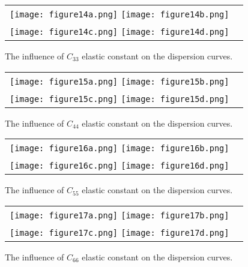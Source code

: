 \documentclass[]{spie}  %
\begin{document}
\begin{figure} [ht]
	\begin{center}
		\begin{tabular}{cc} %
			\texttt{[image: figure14a.png]}
			\texttt{[image: figure14b.png]}\\
			\texttt{[image: figure14c.png]}
			\texttt{[image: figure14d.png]}
		\end{tabular}
	\end{center}
	\caption[] 
	{ \label{fig:C33} 
		The influence of \(C_{33}\) elastic constant on the dispersion curves.}
\end{figure} 

\begin{figure} [ht]
	\begin{center}
		\begin{tabular}{cc} %
			\texttt{[image: figure15a.png]}
			\texttt{[image: figure15b.png]}\\
			\texttt{[image: figure15c.png]}
			\texttt{[image: figure15d.png]}
		\end{tabular}
	\end{center}
	\caption[] 
	{ \label{fig:C44} 
		The influence of \(C_{44}\) elastic constant on the dispersion curves.}
\end{figure} 

\begin{figure} [ht]
	\begin{center}
		\begin{tabular}{cc} %
			\texttt{[image: figure16a.png]}
			\texttt{[image: figure16b.png]}\\
			\texttt{[image: figure16c.png]}
			\texttt{[image: figure16d.png]}
		\end{tabular}
	\end{center}
	\caption[] 
	{ \label{fig:C55} 
		The influence of \(C_{55}\) elastic constant on the dispersion curves.}
\end{figure} 

\begin{figure} [ht]
	\begin{center}
		\begin{tabular}{cc} %
			\texttt{[image: figure17a.png]}
			\texttt{[image: figure17b.png]}\\
			\texttt{[image: figure17c.png]}
			\texttt{[image: figure17d.png]}
		\end{tabular}
	\end{center}
	\caption[] 
	{ \label{fig:C66} 
		The influence of \(C_{66}\) elastic constant on the dispersion curves.}
\end{figure} 
\clearpage
\end{document}
